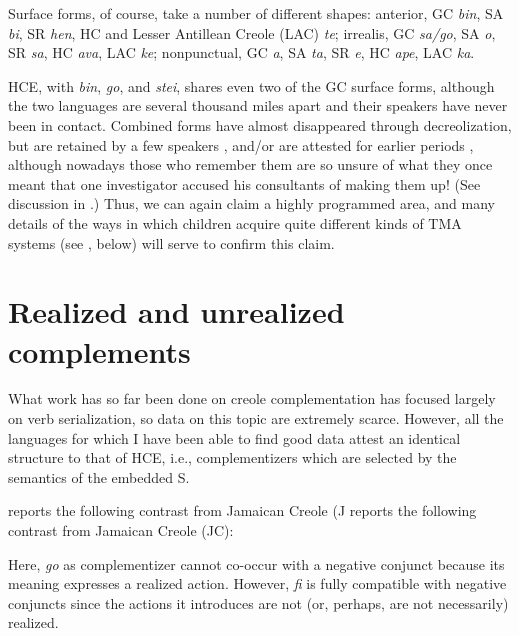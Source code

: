
Surface forms, of course, take a number of different shapes: 
anterior, 
 GC \textit{bin}, 
 SA \textit{bi}, 
 SR \textit{hen}, 
 HC and Lesser Antillean Creole (LAC) \textit{te}; 
irrealis, 
 GC \textit{sa/go}, 
 SA \textit{o},
 SR \textit{sa}, 
 HC \textit{ava}, 
 LAC \textit{ke};
nonpunctual, 
 GC \textit{a}, 
 SA \textit{ta}, 
 SR \textit{e}, 
 HC \textit{ape}, 
 LAC \textit{ka}.

HCE, with \textit{bin}, \textit{go}, and \textit{stei}, shares even two of the GC surface forms, although the two languages are several thousand miles apart and their speakers have never been in contact. Combined forms have almost disappeared through decreolization, but are retained by a few speakers \citep{Bickerton1974}, and/or are attested for earlier periods \citep{Reinecke1969,Tsuzaki1971}, although nowadays those who remember them are so unsure of what they once meant that one investigator \citep{Perlman1973} accused his consultants of making them up! (See discussion in \citealt[183ff]{Bickerton1980}.) Thus, we can again claim a highly programmed area, and many details of the ways in which children acquire quite different kinds of TMA systems (see , below) will serve to confirm this claim.

\section{Realized and unrealized complements}

What work has so far been done on creole complementation has focused largely on verb serialization, so data on this topic are extremely scarce. However, all the languages for which I have been able to find good data attest an identical structure to that of HCE, i.e., complementizers which are selected by the semantics of the embedded S.

\citet{Roberts1975} reports the following contrast from Jamaican Creole (J reports the following contrast from Jamaican Creole (JC):

\z

\label{ex:2:28}\z
Here, \textit{go} as complementizer cannot co-occur with a negative conjunct because its meaning expresses a realized action. However, \textit{fi} is fully
compatible with negative conjuncts since the actions it introduces are not (or, perhaps, are not necessarily) realized.


